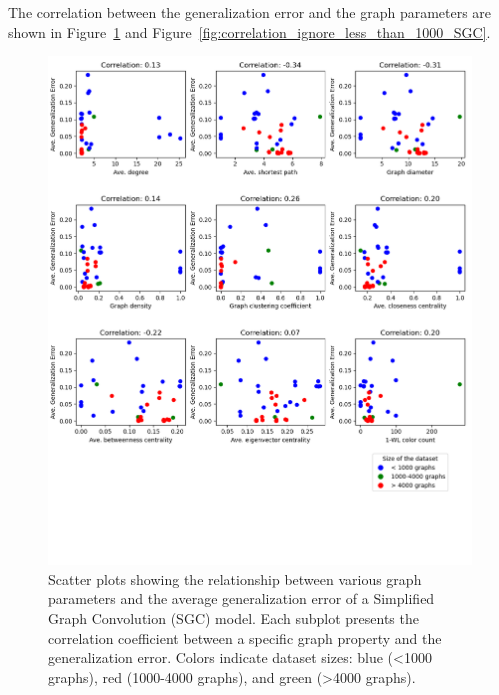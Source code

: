The correlation between the generalization error and the graph parameters are shown in Figure~\ref{fig:correlation_SGC} and Figure~\ref{fig:correlation_ignore_less_than_1000_SGC}.

\begin{figure}[H]
    \centering
    \includegraphics[scale=0.6]{images/correlation_SGC.png}
    \caption{Scatter plots showing the relationship between various graph parameters and the average generalization error of a Simplified Graph Convolution (SGC) model. Each subplot presents the correlation coefficient between a specific graph property and the generalization error. Colors indicate dataset sizes: blue (<1000 graphs), red (1000-4000 graphs), and green (>4000 graphs).}
    \label{fig:correlation_SGC}
\end{figure}

